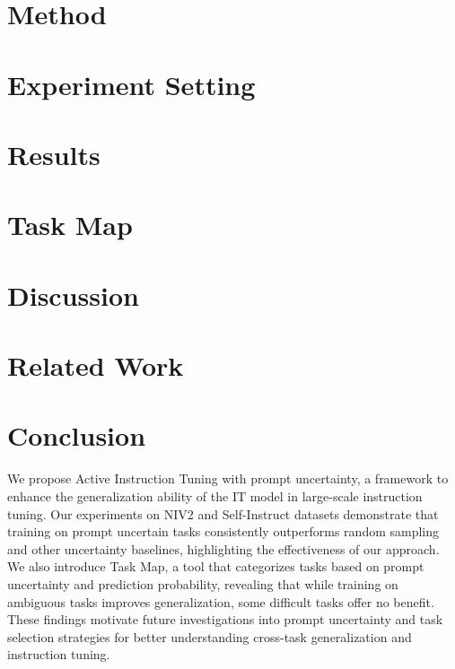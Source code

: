 \documentclass[11pt]{article}
\begin{document}
\section{Method}
\label{sec:method}

\section{Experiment Setting}


\section{Results}
\label{sec:results}

\section{Task Map}
\label{sec:task-map}

\section{Discussion}

\section{Related Work}

\section{Conclusion}
We propose Active Instruction Tuning with prompt uncertainty, a framework to enhance the generalization ability of the IT model in large-scale instruction tuning. Our experiments on NIV2 and Self-Instruct datasets demonstrate that training on prompt uncertain tasks consistently outperforms random sampling and other uncertainty baselines, highlighting the effectiveness of our approach. We also introduce Task Map, a tool that categorizes tasks based on prompt uncertainty and prediction probability, revealing that while training on ambiguous tasks improves generalization, some difficult tasks offer no benefit.
These findings motivate future investigations into prompt uncertainty and task selection strategies for better understanding cross-task generalization and instruction tuning.
\end{document}
